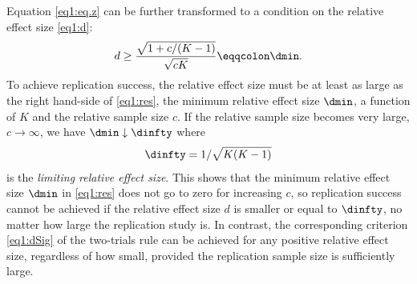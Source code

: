 Equation \eqref{eq1:eq.z} can be further transformed to a
condition on the relative effect size \eqref{eq1:d}:
\begin{equation}\label{eq1:res}
  d \geq  \frac{\sqrt{1+c/(K-1)}}{ \sqrt{c K}} \eqqcolon \dmin .
\end{equation}
To achieve replication success, the relative effect size must be at least as
large as the right hand-side of \eqref{eq1:res}, the minimum relative effect
size $\dmin$, a function of $K$ and the relative sample size $c$. If the
relative sample size becomes very large, \ie{} $c \rightarrow \infty$, we have
$\dmin \downarrow \dinfty$ where
\begin{equation}\label{eq1:smallestpossible}
  \dinfty = 1/\sqrt{K (K-1)}
\end{equation}
is the \textit{limiting relative effect size}. This shows that the minimum
relative effect size $\dmin$ in \eqref{eq1:res} does not go to zero for
increasing $c$, so replication success cannot be achieved if the relative effect
size $d$ is smaller or equal to $\dinfty$, no matter how large the replication
study is. In contrast, the corresponding criterion \eqref{eq1:dSig} of the
two-trials rule can be achieved for any positive relative effect size,
regardless of how small, provided the replication sample size is sufficiently
large.


